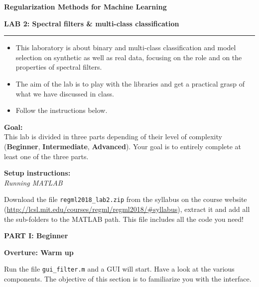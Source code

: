 \documentclass[DIN, pagenumber=false, fontsize=11pt, parskip=half]{scrartcl}
\newcommand{\mytitle}[1]{{\noindent\LARGE\textbf{#1}}}
\newcommand{\mysection}[1]{\noindent\large\textbf{#1}}
\begin{document}
\noindent\textbf{Regularization Methods for Machine Learning}

\mytitle{\center LAB 2: Spectral filters \& multi-class classification}\\
\rule{\textwidth}{1pt}
\begin{itemize}\itemsep1pt \parskip0pt 
  \item This laboratory is about binary and multi-class classification and model selection on synthetic as well as real data, focusing on the role and on the properties of spectral filters.
  \item The aim of the lab is to play with the libraries and get a practical grasp of what we have discussed in class.
  \item Follow the instructions below.  
\end{itemize}

\begin{framed}
\textbf{\textbf{Goal}:} \\
This lab is divided in three parts depending of their level of complexity (\textbf{Beginner}, \textbf{Intermediate}, \textbf{Advanced}). Your goal is to entirely complete at least one of the three parts.
\end{framed}

\begin{framed}
\textbf{\textbf{Setup instructions}:} \\
\textit{Running MATLAB}

 Download the file \texttt{regml2018\_lab2.zip} from the syllabus on the course website (\url{http://lcsl.mit.edu/courses/regml/regml2018/\#syllabus}), extract it and add all the sub-folders to the MATLAB path. This file includes all the code you need!
\end{framed}

\pagebreak
\begin{center}
\large\textbf{PART I: Beginner}
\end{center}

\mysection{Overture: Warm up}

\noindent Run the file \texttt{gui\_filter.m} and a GUI will start. Have a look at the various components.
The objective of this section is to familiarize you with the interface.
\end{document}
